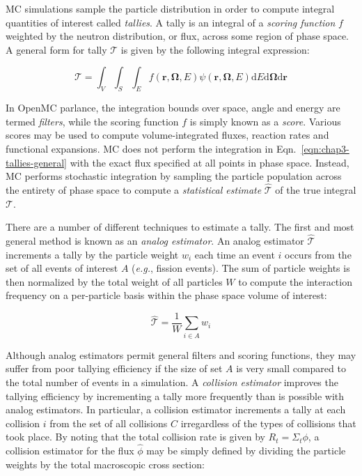 \ac{MC} simulations sample the particle distribution in order to compute integral quantities of interest called \textit{tallies}. A tally is an integral of a \textit{scoring function} $f$ weighted by the neutron distribution, or flux, across some region of phase space. A general form for tally $\mathcal{T}$ is given by the following integral expression:

\begin{dmath}
\label{eqn:chap3-tallies-general}
\mathcal{T} = \int_{V} \int_{S} \int_{E}  f(\mathbf{r},\mathbf{\Omega},E)\psi(\mathbf{r},\mathbf{\Omega},E)\mathrm{d}E\mathrm{d}\mathbf{\Omega}\mathrm{d}\mathbf{r} 
\end{dmath}

In OpenMC parlance, the integration bounds over space, angle and energy are termed \textit{filters}, while the scoring function $f$ is simply known as a \textit{score}. Various scores may be used to compute volume-integrated fluxes, reaction rates and functional expansions. \ac{MC} does not perform the integration in Eqn.~\ref{eqn:chap3-tallies-general} with the exact flux specified at all points in phase space. Instead, \ac{MC} performs stochastic integration by sampling the particle population across the entirety of phase space to compute a \textit{statistical estimate} $\hat{\mathcal{T}}$ of the true integral $\mathcal{T}$.

There are a number of different techniques to estimate a tally. The first and most general method is known as an \textit{analog estimator}. An analog estimator $\hat{\mathcal{T}}$ increments a tally by the particle weight $w_{i}$ each time an event $i$ occurs from the set of all events of interest $A$ (\textit{e.g.}, fission events). The sum of particle weights is then normalized by the total weight of all particles $W$ to compute the interaction frequency on a per-particle basis within the phase space volume of interest:

\begin{dmath}
\label{eqn:chap3-tallies-analog}
\hat{\mathcal{T}} = \frac{1}{W}\displaystyle\sum\limits_{i \in A} w_{i}
\end{dmath}

Although analog estimators permit general filters and scoring functions, they may suffer from poor tallying efficiency if the size of set $A$ is very small compared to the total number of events in a simulation. A \textit{collision estimator} improves the tallying efficiency by incrementing a tally more frequently than is possible with analog estimators. In particular, a collision estimator increments a tally at each collision $i$ from the set of all collisions $C$ irregardless of the types of collisions that took place. By noting that the total collision rate is given by $R_{t} = \Sigma_{t}\phi$, a collision estimator for the flux $\hat{\phi}$ may be simply defined by dividing the particle weights by the total macroscopic cross section:


